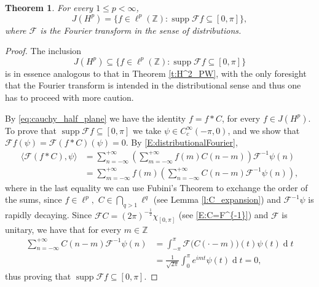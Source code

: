 \documentclass[12pt,a4paper,reqno]{amsart}
\newtheorem{thm}{Theorem}[section]
\theoremstyle{definition}
\theoremstyle{definition}\newtheorem{defn}[thm]{Definition}
\begin{document}
    \begin{thm}\label{t:H^p_PW}
    For every $1\leqslant p<\infty$,
    \[
    J(H^p)=\{f\in \ell^p(\mathbb Z): \operatorname{supp}\mathcal F f\subseteq [0,\pi]\},
    \]
    where $\mathcal{F}$ is the Fourier transform in the sense of distributions.
    \end{thm}
    
    \begin{proof}
    The inclusion
    \[
    J(H^p)\subseteq \{f\in \ell^p(\mathbb Z): \operatorname{supp}\mathcal F f\subseteq [0,\pi]\}
    \]
    is in essence analogous to that in Theorem \ref{t:H^2_PW}, with the only foresight that the Fourier transform is intended in the distributional sense and thus one has to proceed with more caution. 
    
    By \eqref{eq:cauchy_half_plane} we have the identity $f=f\ast C$, for every $f\in J(H^p)$. %
    To prove that $\operatorname{supp}\mathcal F f\subseteq [0,\pi]$ we take $\psi\in C_c^\infty(-\pi,0)$, and we show that $\mathcal{F}f(\psi)=\mathcal{F}(f\ast C)(\psi)=0$. By \eqref{E:distributionalFourier},
    \begin{align}\label{E:distribuzionenulla0}
      \nonumber  \langle \mathcal F(f\ast  C),\psi\rangle &=\sum_{n=-\infty}^{+\infty} \left(\sum_{m=-\infty}^{+\infty} f(m)C(n-m)\right) \mathcal{F}^{-1}\psi(n)\\
        &=\sum_{m=-\infty}^{+\infty} f(m)\left(\sum_{n=-\infty}^{+\infty} C(n-m) \mathcal{F}^{-1}\psi(n)\right),
    \end{align}
    where in the last equality we can use Fubini's Theorem to exchange the order of the sums, since $f\in\ell^p,$ $C\in\bigcap_{q>1}\ell^q$ (see Lemma \ref{l:C_expansion}) and $\mathcal{F}^{-1}\psi$ is rapidly decaying. Since $\mathcal{F}C=(2\pi)^{-\frac{1}{2}}\chi_{[0,\pi]}$ (see \eqref{E:C=F^{-1}}) and $\mathcal{F}$ is unitary, we have that for every $m\in\mathbb{Z}$
    \begin{align*}
        \sum_{n=-\infty}^{+\infty} C(n-m) \mathcal{F}^{-1}\psi(n) &= \int_{-\pi}^{\pi}\mathcal{F}\big(C(\cdot-m)\big)(t)\psi(t)\operatorname{d}\!t\\ 
        &=\frac{1}{\sqrt{2\pi}}\int_{0}^{\pi}e^{imt}\psi(t)\operatorname{d}\!t=0,
    \end{align*}
    thus proving that $\operatorname{supp}\mathcal F f\subseteq [0,\pi]$.
    

\end{proof}
\end{document}
